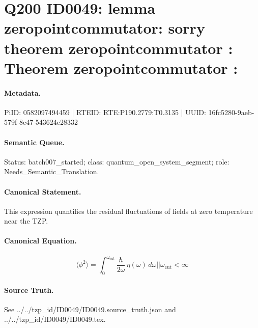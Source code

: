 \section*{Q200 ID0049: lemma zeropointcommutator: sorry theorem zeropointcommutator : Theorem zeropointcommutator :}
\paragraph{Metadata.}
PiID: 0582097494459 | RTEID: RTE:P190.2779:T0.3135 | UUID: 16fc5280-9aeb-579f-8c47-543624e28332

\paragraph{Semantic Queue.}
Status: batch007\_started; class: quantum\_open\_system\_segment; role: Needs\_Semantic\_Translation.

\paragraph{Canonical Statement.}
This expression quantifies the residual fluctuations of fields at zero temperature near the TZP.

\paragraph{Canonical Equation.}
\[
\langle \phi^{2} \rangle = \int_{0}^{\omega_{\mathrm{cut}}} \frac{\hbar}{2\omega}\, \eta(\omega)\,d\omega || \omega_{\mathrm{cut}} < \infty
\]

\paragraph{Source Truth.}
See ../../tzp\_id/ID0049/ID0049.source\_truth.json and ../../tzp\_id/ID0049/ID0049.tex.
